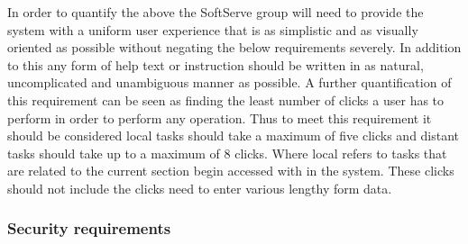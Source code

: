 \begin{flushleft}
In order to quantify the above the SoftServe group will need to provide the system with a uniform user experience that is as simplistic and as visually oriented as possible without negating the below requirements severely. In addition to this any form of help text or instruction should be written in as natural, uncomplicated and unambiguous manner as possible. A further quantification of this requirement can be seen as finding the least number of clicks a user has to perform in order to perform any operation. Thus to meet this requirement it should be considered local tasks should take a maximum of five clicks and distant tasks should take up to a maximum of 8 clicks. Where local refers to tasks that are related to the current section begin accessed with in the system. These clicks should not include the clicks need to enter various lengthy form data.

\end{flushleft}

\subsubsection{Security requirements}

